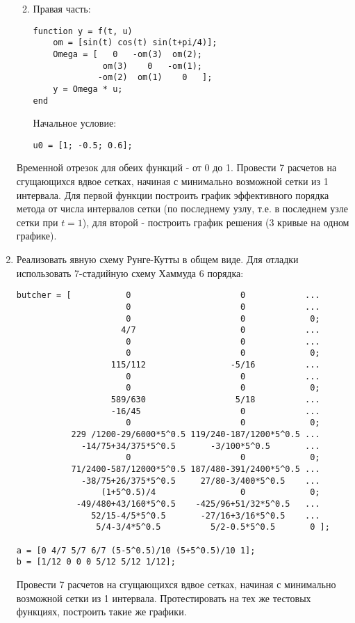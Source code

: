 \begin{enumerate}
\begin{enumerate}
\begin{matlablisting}
\end{matlablisting}
\item Правая часть:
\begin{matlablisting}
	\begin{lstlisting}
function y = f(t, u)
    om = [sin(t) cos(t) sin(t+pi/4)];
    Omega = [   0   -om(3)  om(2); 
              om(3)    0   -om(1);
             -om(2)  om(1)    0   ];
    y = Omega * u;
end
	\end{lstlisting}
\end{matlablisting}
Начальное условие:
\begin{matlablisting}
	\begin{lstlisting}
u0 = [1; -0.5; 0.6];
	\end{lstlisting}
\end{matlablisting}
\end{enumerate}
Временной отрезок для обеих функций - от 0 до 1. Провести 7 расчетов на сгущающихся вдвое сетках, начиная с минимально возможной сетки из 1 интервала. Для первой функции построить график эффективного порядка метода от числа интервалов сетки (по последнему узлу, т.е. в последнем узле сетки при $t=1$), для второй - построить график решения (3 кривые на одном графике). 
\item Реализовать явную схему Рунге-Кутты в общем виде. Для отладки использовать 7-стадийную схему Хаммуда 6 порядка:
\begin{matlablisting}
	\begin{lstlisting}
butcher = [           0                      0            ...
                      0                      0            ...
                      0                      0             0;
                     4/7                     0            ...
                      0                      0            ... 
                      0                      0             0;
                   115/112                 -5/16          ...  
                      0                      0            ...
                      0                      0             0;
                   589/630                  5/18          ...
                   -16/45                    0            ...
                      0                      0             0;
           229 /1200-29/6000*5^0.5 119/240-187/1200*5^0.5 ...
             -14/75+34/375*5^0.5       -3/100*5^0.5       ...        
                      0                      0             0;
           71/2400-587/12000*5^0.5 187/480-391/2400*5^0.5 ...
             -38/75+26/375*5^0.5     27/80-3/400*5^0.5    ...
                 (1+5^0.5)/4                 0             0;
            -49/480+43/160*5^0.5    -425/96+51/32*5^0.5   ...   
               52/15-4/5*5^0.5       -27/16+3/16*5^0.5    ...
                5/4-3/4*5^0.5          5/2-0.5*5^0.5       0 ];

a = [0 4/7 5/7 6/7 (5-5^0.5)/10 (5+5^0.5)/10 1];
b = [1/12 0 0 0 5/12 5/12 1/12];
	\end{lstlisting}
\end{matlablisting}
Провести 7 расчетов на сгущающихся вдвое сетках, начиная с минимально возможной сетки из 1 интервала. Протестировать на тех же тестовых функциях, построить такие же графики.
\end{enumerate}